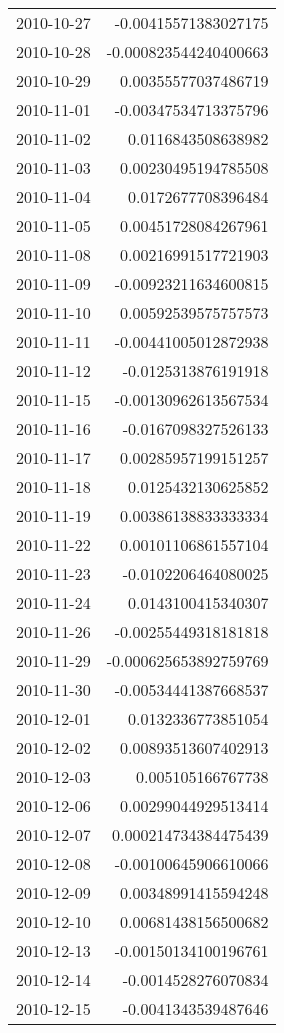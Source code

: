 \begin{tabular}{l | r}
2010-10-27 & -0.00415571383027175 \\
2010-10-28 & -0.000823544240400663 \\
2010-10-29 & 0.00355577037486719 \\
2010-11-01 & -0.00347534713375796 \\
2010-11-02 & 0.0116843508638982 \\
2010-11-03 & 0.00230495194785508 \\
2010-11-04 & 0.0172677708396484 \\
2010-11-05 & 0.00451728084267961 \\
2010-11-08 & 0.00216991517721903 \\
2010-11-09 & -0.00923211634600815 \\
2010-11-10 & 0.00592539575757573 \\
2010-11-11 & -0.00441005012872938 \\
2010-11-12 & -0.0125313876191918 \\
2010-11-15 & -0.00130962613567534 \\
2010-11-16 & -0.0167098327526133 \\
2010-11-17 & 0.00285957199151257 \\
2010-11-18 & 0.0125432130625852 \\
2010-11-19 & 0.00386138833333334 \\
2010-11-22 & 0.00101106861557104 \\
2010-11-23 & -0.0102206464080025 \\
2010-11-24 & 0.0143100415340307 \\
2010-11-26 & -0.00255449318181818 \\
2010-11-29 & -0.000625653892759769 \\
2010-11-30 & -0.00534441387668537 \\
2010-12-01 & 0.0132336773851054 \\
2010-12-02 & 0.00893513607402913 \\
2010-12-03 & 0.005105166767738 \\
2010-12-06 & 0.00299044929513414 \\
2010-12-07 & 0.000214734384475439 \\
2010-12-08 & -0.00100645906610066 \\
2010-12-09 & 0.00348991415594248 \\
2010-12-10 & 0.00681438156500682 \\
2010-12-13 & -0.00150134100196761 \\
2010-12-14 & -0.0014528276070834 \\
2010-12-15 & -0.0041343539487646 \\

\end{tabular}
